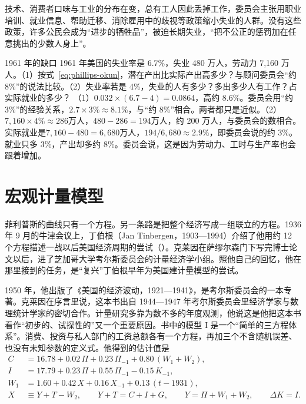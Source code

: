 技术、消费者口味与工业的分布在变，总有工人因此丢掉工作，委员会主张用职业培训、就业信息、帮助迁移、消除雇用中的歧视等政策缩小失业的人群\cite{erp1962}。没有这些政策，许多公民会成为“进步的牺牲品”，被迫长期失业，“把不公正的惩罚加在任意挑出的少数人身上”\cite{erp1962}。

\begin{example}{1961 年的缺口}\label{ex:phillips-okun}
1961 年美国的失业率是 6.7\%，失业 480 万人，劳动力 7,160 万人\cite{erp1962}。（1）按式~\eqref{eq:phillips-okun}，潜在产出比实际产出高多少？与顾问委员会“约 8\%”的说法比较。（2）失业率若是 4\%，失业的人有多少？多出多少人有工作？占实际就业的多少？
\solution
（1）$0.032\times(6.7-4)=0.0864$，高约 8.6\%。委员会用“约 3\%”的经验关系，$2.7\times3\%\approx8.1\%$，与“约 8\%”相合\cite{erp1962}。两者都只是近似。（2）$7{,}160\times4\%\approx286$万人，$480-286=194$万人，约 200 万人，与委员会的数相合\cite{erp1962}。实际就业是$7{,}160-480=6{,}680$万人，$194/6{,}680\approx2.9\%$，即委员会说的约 3\%\cite{erp1962}。就业只多 3\%，产出却多约 8\%。委员会说，这是因为劳动力、工时与生产率也会跟着增加\cite{erp1962}。
\end{example}

\section{宏观计量模型}\label{sec:phillips-models}

菲利普斯的曲线只有一个方程。另一条路是把整个经济写成一组联立的方程。1936 年 9 月的牛津会议上，丁伯根（Jan Tinbergen，1903—1994）介绍了他用约 12 个方程描述一战以后美国经济周期的尝试（）\cite{oxford1937,loc38}。克莱因在萨缪尔森门下写完博士论文以后，进了芝加哥大学考尔斯委员会的计量经济学小组\cite{nobel1980bio}。照他自己的回忆，他在那里接到的任务，是“复兴”丁伯根早年为美国建计量模型的尝试\cite{nobel1980bio}。

1950 年，他出版了《美国的经济波动，1921—1941》，是考尔斯委员会的一本专著\cite{klein1950}。克莱因在序言里说，这本书出自 1944—1947 年考尔斯委员会里经济学家与数理统计学家的密切合作\cite{klein1950}。计量研究多靠为数不多的年度观测，他说这是他把这本书看作“初步的、试探性的”又一个重要原因\cite{klein1950}。书中的模型 I 是一个“简单的三方程体系”\cite{klein1950}。消费、投资与私人部门的工资总额各有一个方程，再加三个不含随机误差、也没有未知参数的定义式\cite{klein1950}。他得到的估计值是
\begin{equation}
\begin{aligned}
C&=16.78+0.02\,\Pi+0.23\,\Pi_{-1}+0.80\,(W_1+W_2),\\
I&=17.79+0.23\,\Pi+0.55\,\Pi_{-1}-0.15\,K_{-1},\\
W_1&=1.60+0.42\,X+0.16\,X_{-1}+0.13\,(t-1931),\\
X&\equiv Y+T-W_2,\qquad Y+T=C+I+G,\qquad Y=\Pi+W_1+W_2,\qquad \Delta K=I.
\end{aligned}\label{eq:phillips-klein}
\end{equation}

